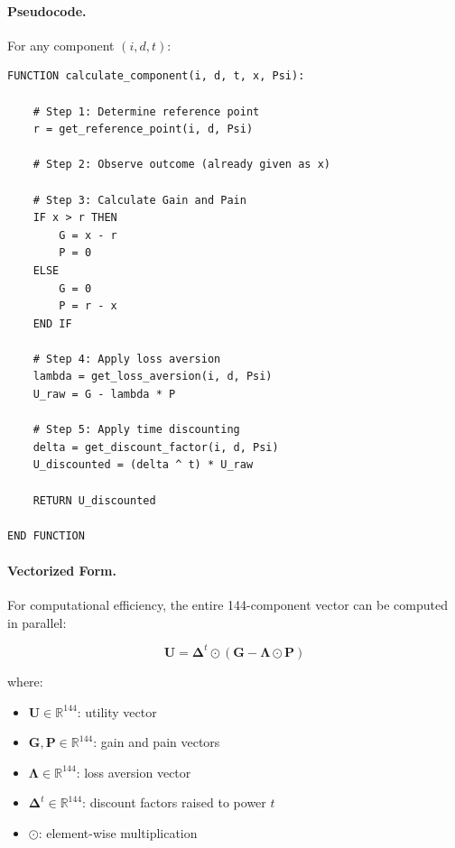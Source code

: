 \paragraph{Pseudocode.}
For any component $(i, d, t)$:

\begin{verbatim}
FUNCTION calculate_component(i, d, t, x, Psi):
    
    # Step 1: Determine reference point
    r = get_reference_point(i, d, Psi)
    
    # Step 2: Observe outcome (already given as x)
    
    # Step 3: Calculate Gain and Pain
    IF x > r THEN
        G = x - r
        P = 0
    ELSE
        G = 0
        P = r - x
    END IF
    
    # Step 4: Apply loss aversion
    lambda = get_loss_aversion(i, d, Psi)
    U_raw = G - lambda * P
    
    # Step 5: Apply time discounting
    delta = get_discount_factor(i, d, Psi)
    U_discounted = (delta ^ t) * U_raw
    
    RETURN U_discounted
    
END FUNCTION
\end{verbatim}

\paragraph{Vectorized Form.}
For computational efficiency, the entire 144-component vector can be 
computed in parallel:

\begin{equation}
\mathbf{U} = \boldsymbol{\Delta}^t \odot \left( \mathbf{G} - \boldsymbol{\Lambda} \odot \mathbf{P} \right)
\end{equation}

where:
\begin{itemize}
\item $\mathbf{U} \in \mathbb{R}^{144}$: utility vector
\item $\mathbf{G}, \mathbf{P} \in \mathbb{R}^{144}$: gain and pain vectors
\item $\boldsymbol{\Lambda} \in \mathbb{R}^{144}$: loss aversion vector
\item $\boldsymbol{\Delta}^t \in \mathbb{R}^{144}$: discount factors raised to power $t$
\item $\odot$: element-wise multiplication
\end{itemize}

